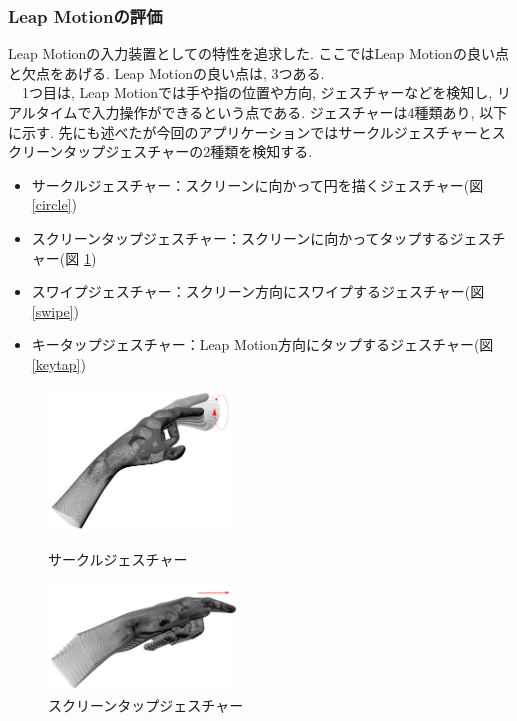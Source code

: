 \documentclass{funthesis}
\begin{document}
\subsubsection{Leap Motionの評価}
Leap Motionの入力装置としての特性を追求した. ここではLeap Motionの良い点と欠点をあげる. Leap Motionの良い点は, 3つある. \\ 
　1つ目は, Leap Motionでは手や指の位置や方向, ジェスチャーなどを検知し, リアルタイムで入力操作ができるという点である. ジェスチャーは4種類あり, 以下に示す. 先にも述べたが今回のアプリケーションではサークルジェスチャーとスクリーンタップジェスチャーの2種類を検知する. \\

\begin{itemize}
 \item サークルジェスチャー：スクリーンに向かって円を描くジェスチャー(図 \ref{circle})
 \item スクリーンタップジェスチャー：スクリーンに向かってタップするジェスチャー(図 \ref{sctap})
 \item スワイプジェスチャー：スクリーン方向にスワイプするジェスチャー(図 \ref{swipe})
 \item キータップジェスチャー：Leap Motion方向にタップするジェスチャー(図 \ref{keytap})
\end{itemize}

\begin{figure}[H]
 \begin{minipage}{0.5\hsize}
  \begin{center}
  \includegraphics[width=50mm]{./img/Circle.png}
  \end{center}
  \caption{サークルジェスチャー}
  \label{circle}
 \end{minipage}
 \begin{minipage}{0.5\hsize}
  \begin{center}
  \includegraphics[width=50mm]{./img/ScTap.png}
  \end{center}
  \caption{スクリーンタップジェスチャー}
  \label{sctap}
  \end{minipage}
\end{figure}
\end{document}
